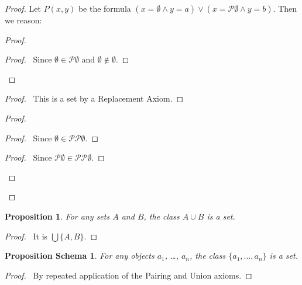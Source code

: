 \documentclass{report}
\let\qed\relax
\newtheorem{proposition}[axiom]{Proposition}
\newtheorem{props}[axiom]{Proposition Schema}
\theoremstyle{definition}
\begin{document}
    \begin{proof}
        \pf
        Let $P(x,y)$ be the formula $(x = \emptyset \wedge y = a) \vee (x = \mathcal{P} \emptyset \wedge
        y = b)$. Then we reason:
        \begin{proof}
            \begin{proof}
                \pf\ Since $\emptyset \in \mathcal{P} \emptyset$ and $\emptyset \notin \emptyset$.
            \end{proof}
        \end{proof}
        \begin{proof}
            \pf\ This is a set by a Replacement Axiom.
        \end{proof}
        \begin{proof}
            \begin{proof}
                \pf\ Since $\emptyset \in \mathcal{P} \mathcal{P} \emptyset$.
            \end{proof}
            \begin{proof}
                \pf\ Since $\mathcal{P} \emptyset \in \mathcal{P} \mathcal{P} \emptyset$.
            \end{proof}
        \end{proof}
        \qed
    \end{proof}

    \begin{proposition}
        For any sets $A$ and $B$, the class $A \cup B$ is a set.
    \end{proposition}

    \begin{proof}
        \pf\ It is $\bigcup \{ A, B \}$. \qed
    \end{proof}

    \begin{props}
        For any objects $a_1$, \ldots, $a_n$, the class $\{ a_1, \ldots, a_n \}$ is a set.
    \end{props}

    \begin{proof}
        \pf\ By repeated application of the Pairing and Union axioms. \qed
    \end{proof}
\end{document}
